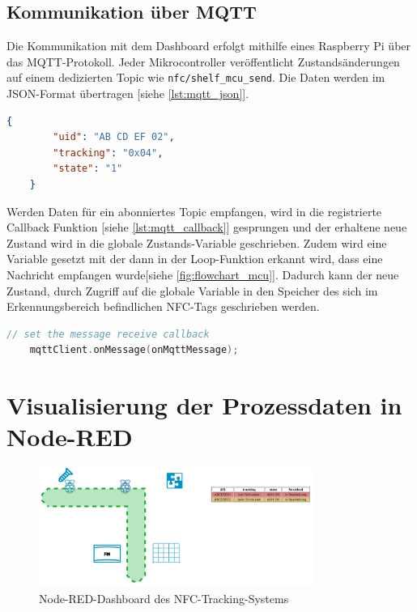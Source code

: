 \newpage

\subsection{Kommunikation über MQTT}

Die Kommunikation mit dem Dashboard erfolgt mithilfe eines Raspberry Pi über das MQTT-Protokoll. Jeder Mikrocontroller veröffentlicht Zustandsänderungen auf einem dedizierten Topic wie \texttt{nfc/shelf\_mcu\_send}. Die Daten werden im JSON-Format übertragen [siehe \autoref{lst:mqtt_json}].

\begin{lstlisting}[language=json, caption={Beispiel einer MQTT JSON Nachricht von der Werkerassistenzstation (0x04: zur Schraubstation, 1: iO) (siehe \autoref{tab:tracking_states})}, label={lst:mqtt_json}]
	{
		"uid": "AB CD EF 02",
		"tracking": "0x04",
		"state": "1"
	}
\end{lstlisting}

Werden Daten für ein abonniertes Topic empfangen, wird in die registrierte Callback Funktion [siehe \autoref{lst:mqtt_callback}] gesprungen und der erhaltene neue Zustand wird in die globale Zustands-Variable geschrieben. Zudem wird eine Variable gesetzt mit der dann in der Loop-Funktion erkannt wird, dass eine Nachricht empfangen wurde[siehe \autoref{fig:flowchart_mcu}]. Dadurch kann der neue Zustand, durch Zugriff auf die globale Variable in den Speicher des sich im Erkennungsbereich befindlichen NFC-Tags geschrieben werden. 

\begin{lstlisting}[language=C, caption={Registrierung des Callbacks in der Setup-Funktion}, label={lst:mqtt_callback}]
	// set the message receive callback
	mqttClient.onMessage(onMqttMessage);
\end{lstlisting}

\section{Visualisierung der Prozessdaten in Node-RED}
\label{sec:Node-Red}

\begin{figure}[H]
	\centering
	\includegraphics[width=0.8\textwidth]{images/node-red-band.jpeg}
	\caption{Node-RED-Dashboard des NFC-Tracking-Systems}
	\label{fig:dashboard}
\end{figure}

